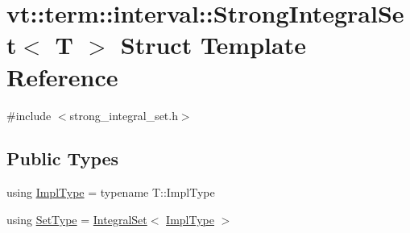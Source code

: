 \hypertarget{structvt_1_1term_1_1interval_1_1_strong_integral_set}{}\section{vt\+:\+:term\+:\+:interval\+:\+:Strong\+Integral\+Set$<$ T $>$ Struct Template Reference}
\label{structvt_1_1term_1_1interval_1_1_strong_integral_set}


{\ttfamily \#include $<$strong\+\_\+integral\+\_\+set.\+h$>$}

\subsection*{Public Types}
\begin{DoxyCompactItemize}
\item 
using \hyperlink{structvt_1_1term_1_1interval_1_1_strong_integral_set_a19d6007eea0762e5c42e597c4ea92d83}{Impl\+Type} = typename T\+::\+Impl\+Type
\item 
using \hyperlink{structvt_1_1term_1_1interval_1_1_strong_integral_set_a8ddaa89df13b55d7a13b6275c162f51e}{Set\+Type} = \hyperlink{namespacevt_af8fc7210a3d8e598330cf3375857ef1e}{Integral\+Set}$<$ \hyperlink{structvt_1_1term_1_1interval_1_1_strong_integral_set_a19d6007eea0762e5c42e597c4ea92d83}{Impl\+Type} $>$
\end{DoxyCompactItemize}

